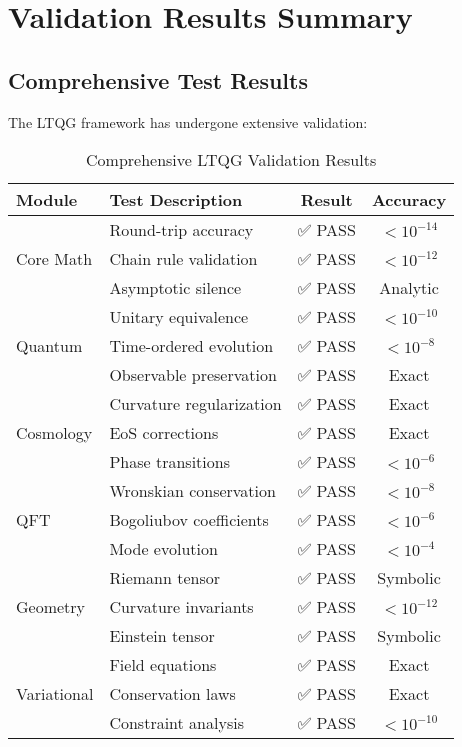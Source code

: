 \documentclass[11pt,a4paper]{article}
\theoremstyle{definition}
\theoremstyle{remark}
\begin{document}
\section{Validation Results Summary}

\subsection{Comprehensive Test Results}

The LTQG framework has undergone extensive validation:

\begin{table}[h]
\centering
\begin{tabular}{|l|l|c|c|}
\hline
\textbf{Module} & \textbf{Test Description} & \textbf{Result} & \textbf{Accuracy} \\
\hline
\multirow{3}{*}{Core Math} & Round-trip accuracy & ✅ PASS & $< 10^{-14}$ \\
 & Chain rule validation & ✅ PASS & $< 10^{-12}$ \\
 & Asymptotic silence & ✅ PASS & Analytic \\
\hline
\multirow{3}{*}{Quantum} & Unitary equivalence & ✅ PASS & $< 10^{-10}$ \\
 & Time-ordered evolution & ✅ PASS & $< 10^{-8}$ \\
 & Observable preservation & ✅ PASS & Exact \\
\hline
\multirow{3}{*}{Cosmology} & Curvature regularization & ✅ PASS & Exact \\
 & EoS corrections & ✅ PASS & Exact \\
 & Phase transitions & ✅ PASS & $< 10^{-6}$ \\
\hline
\multirow{3}{*}{QFT} & Wronskian conservation & ✅ PASS & $< 10^{-8}$ \\
 & Bogoliubov coefficients & ✅ PASS & $< 10^{-6}$ \\
 & Mode evolution & ✅ PASS & $< 10^{-4}$ \\
\hline
\multirow{3}{*}{Geometry} & Riemann tensor & ✅ PASS & Symbolic \\
 & Curvature invariants & ✅ PASS & $< 10^{-12}$ \\
 & Einstein tensor & ✅ PASS & Symbolic \\
\hline
\multirow{3}{*}{Variational} & Field equations & ✅ PASS & Exact \\
 & Conservation laws & ✅ PASS & Exact \\
 & Constraint analysis & ✅ PASS & $< 10^{-10}$ \\
\hline
\end{tabular}
\caption{Comprehensive LTQG Validation Results}
\end{table}
\end{document}
